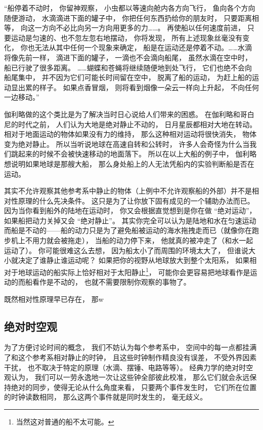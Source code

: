 “船停着不动时， 你留神观察， 小虫都以等速向舱内各方向飞行， 鱼向各个方向随便游动， 水滴滴进下面的罐子中， 你把任何东西扔给你的朋友时， 只要距离相等， 向这一方向不必比向另一方向用更多的力……。 再使船以任何速度前进， 只要运动是匀速的、也不忽左忽右地摆动， 你将发现， 所有上述现象丝毫没有变化， 你也无法从其中任何一个现象来确定， 船是在运动还是停着不动。……水滴将像先前一样， 滴进下面的罐子， 一滴也不会滴向船尾， 虽然水滴在空中时， 船已行驶了很多距离。 ……蝴蝶和苍蝇将继续随便地到处飞行， 它们也绝不会向船尾集中， 并不因为它们可能长时间留在空中， 脱离了船的运动， 为赶上船的运动显出累的样子。 如果点香冒烟， 则将看到烟像一朵云一样向上升起， 不向任何一边移动。”

伽利略做的这个类比是为了解决当时日心说给人们带来的困惑。 在伽利略和哥白尼的时代之前， 人们认为大地是绝对静止不动的， 日月星辰都相对大地在转动。 相对于地面运动的物体如果没有力的维持， 那么这种相对运动将很快消失， 物体变为绝对静止。 所以当听说地球在高速自转和公转时， 许多人会奇怪为什么当我们跳起来的时候不会被快速移动的地面落下。 所以在以上大船的例子中， 伽利略想说明如果地球是那艘大船， 那么身处船上的人无法凭船内的实验判断船是否在运动。

其实不允许观察其他参考系中静止的物体（上例中不允许观察船的外部）并不是相对性原理的什么先决条件。 这只是为了让你放下固有成见的一个辅助办法而已。 因为当你看到船外的陆地在运动时， 你又会根据直觉想到是你在做 “绝对运动”， 如果船把动力关掉又会 “绝对静止”。 其实你完全可以认为是陆地和水在匀速运动而船是不动的——船的动力只是为了避免船被运动的海水拖拽走而已（就像你在跑步机上不用力就会被拖走）， 当船的动力停下来， 他就真的被冲走了（和水一起运动了）。 你可能很难这么去想， 因为船太小了而周围的环境太大了， 但谁说大小就决定了谁静止谁运动呢？ 如果把你的视野从地球放大到整个太阳系， 如果相对于地球运动的船实际上恰好相对于太阳静止\footnote{当然这对普通的船不太可能。}， 可能你会更容易把地球看作是运动的而船看作是不动的， 也就不需要限制你观察的事物了。

既然相对性原理早已存在， 那w

\subsection{绝对时空观} \label{sub_Relat0_1}
为了方便讨论时间的概念， 我们不妨认为每个参考系中， 空间中的每一点都挂满了和这个参考系相对静止的时钟， 且这些时钟制作精良没有误差， 不受外界因素干扰， 也不取决于特定的原理（水滴、摆锤、电路等等）。 经典力学的绝对时空观认为， 我们可以一劳永逸地一次让这些钟全部彼此校准， 那么它们就会永远保持绝对的同步，使得无论从什么角度来看， 只要两个事件发生时， 它们所在位置的时钟读数相同， 那么这两个事件就是同时发生的， 毫无歧义。

